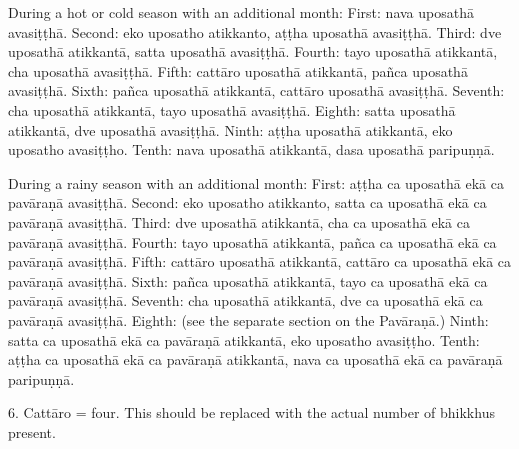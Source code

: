 During a hot or cold season with an additional month:
First: nava uposathā avasiṭṭhā.
Second: eko uposatho atikkanto, aṭṭha uposathā avasiṭṭhā.
Third: dve uposathā atikkantā, satta uposathā avasiṭṭhā.
Fourth: tayo uposathā atikkantā, cha uposathā avasiṭṭhā.
Fifth: cattāro uposathā atikkantā, pañca uposathā avasiṭṭhā.
Sixth: pañca uposathā atikkantā, cattāro uposathā avasiṭṭhā.
Seventh: cha uposathā atikkantā, tayo uposathā avasiṭṭhā.
Eighth: satta uposathā atikkantā, dve uposathā avasiṭṭhā.
Ninth: aṭṭha uposathā atikkantā, eko uposatho avasiṭṭho.
Tenth: nava uposathā atikkantā, dasa uposathā paripuṇṇā.

During a rainy season with an additional month:
First: aṭṭha ca uposathā ekā ca pavāraṇā avasiṭṭhā.
Second: eko uposatho atikkanto, satta ca uposathā ekā ca pavāraṇā avasiṭṭhā.
Third: dve uposathā atikkantā, cha ca uposathā ekā ca pavāraṇā avasiṭṭhā.
Fourth: tayo uposathā atikkantā, pañca ca uposathā ekā ca pavāraṇā avasiṭṭhā.
Fifth: cattāro uposathā atikkantā, cattāro ca uposathā ekā ca pavāraṇā avasiṭṭhā.
Sixth: pañca uposathā atikkantā, tayo ca uposathā ekā ca pavāraṇā avasiṭṭhā.
Seventh: cha uposathā atikkantā, dve ca uposathā ekā ca pavāraṇā avasiṭṭhā.
Eighth: (see the separate section on the Pavāraṇā.)
Ninth: satta ca uposathā ekā ca pavāraṇā atikkantā, eko uposatho avasiṭṭho.
Tenth: aṭṭha ca uposathā ekā ca pavāraṇā atikkantā, nava ca uposathā ekā ca pavāraṇā paripuṇṇā.

6. Cattāro = four. This should be replaced with the actual number of bhikkhus present.

